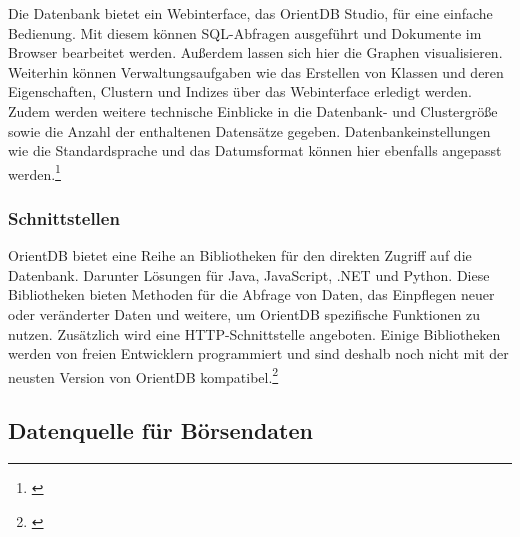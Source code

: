 
Die Datenbank bietet ein Webinterface, das OrientDB Studio, für eine einfache Bedienung. Mit diesem können \gls{SQL}-Abfragen ausgeführt und Dokumente im Browser bearbeitet werden. Außerdem lassen sich hier die Graphen visualisieren. Weiterhin können Verwaltungsaufgaben wie das Erstellen von Klassen und deren Eigenschaften, Clustern und Indizes über das Webinterface erledigt werden. Zudem werden weitere technische Einblicke in die Datenbank- und Clustergröße sowie die Anzahl der enthaltenen Datensätze gegeben. Datenbankeinstellungen wie die Standardsprache und das Datumsformat können hier ebenfalls angepasst werden.\footnote{\cite[Vgl.][]{OrientDBStudio}}

\subsubsection{Schnittstellen}


OrientDB bietet eine Reihe an Bibliotheken für den direkten Zugriff auf die Datenbank. Darunter Lösungen für Java, JavaScript, .NET und Python. Diese Bibliotheken bieten Methoden für die Abfrage von Daten, das Einpflegen neuer oder veränderter Daten und weitere, um OrientDB spezifische Funktionen zu nutzen. Zusätzlich wird eine \gls{HTTP}-Schnittstelle angeboten. Einige Bibliotheken werden von freien Entwicklern programmiert und sind deshalb noch nicht mit der neusten Version von OrientDB kompatibel.\footnote{\cite[Vgl.][]{OrientDBBindings}}

\subsection{Datenquelle für Börsendaten}


